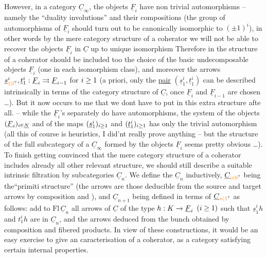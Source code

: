 However, in a category $\underline{C}_{\infty}$, the objects $\underline{F}_i$ have non trivial automorphisms -- namely the ``duality involutions'' and their compositions (the group of automorphisms of $\underline{F}_i$ should turn out to be canonically isomorphic to $(\pm1)^i$), in  other words by the mere category structure of a coherator we will not be able to recover the objects $\underline{F}_i$ in $\underline{C}$ up to unique isomorphism Therefore in the structure of a coherator should be included too the choice of the basic undecomposable objects $\underline{F}_i$ (one in each isomorphism class), and moreover the arrows $\underline{s}_{\unsure{1|l}}^i,\underline{t}_1^i:\underline{F}_i\handwritten{\rightrightarrows}\underline{F}_{i-1}$ for $i\geq1$ (a priori, only the \uline{pair} $(\underline{s}_1^i,\underline{t}_1^i)$ can be described intrinsically in terms of the category structure of $\underline{C}$, once $\underline{F}_i$ and $\underline{F}_{i-1}$ are chosen \ldots). But it now occurs to me that we dont have to put in this extra structure afte all. -- while the $\underline{F}_i$'s separately do have automorphisms, the system of the objects $(\underline{F}_i)_{i\in\underline{N}}$ and of the maps $(\underline{s}_1^i)_{i\geq1}$ and $(\underline{t}_1^i)_{i\geq1}$ has only the trivial automorphism (all this of course is heuristics, I did'nt really prove anything -- but the structure of the full subcategory of a $\underline{C}_{\infty}$ formed by the objects $\underline{F}_i$ seems pretty obvious \ldots). To finish getting convinced that the mere category structure of a coherator includes already all other relevant structure, we should still describe a suitable intrinsic filtration by subcategories $\underline{C}_n$. We define the $\underline{C}_n$ inductively, $\underline{C}_{\unsure{o|0}}$ being the``primiti structure'' (the arrows are those deducible from the source and target arrows by composition and ), and $\underline{C}_{n+1}$ being defined in terms of $\underline{C}_{\unsure{n|1}}$ as follows: add to $\mathrm{Fl}\,\underline{C}_n$ all arrows of $\underline{C}$ of the type $h:K\to\underline{F}_i$ $(i\geq1)$ such that $\underline{s}_1^i h$ and $t_1^i h$ are in $\underline{C}_n$, and the arrows deduced from the bunch obtained  by composition and fibered products. In view of these constructions, it would be an easy exercise to give an  caracterisation of a coherator, as a category satisfying certain internal properties.

